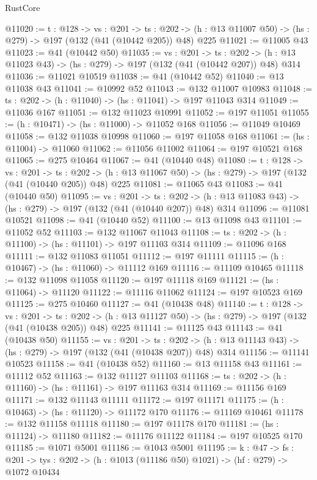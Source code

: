 \begin{lexlean}{RustCore}
\begin{coremodule}
@11020 := {t : @128} ->
  {vs : @201} ->
  {ts : @202} -> (h : @13 @11007 @50) -> (hs : @279) -> @197 (@132 (@41 (@10442 @205)) @48) @225
@11021 := @11005 @43
@11023 := @41 (@10442 @50)
@11035 := {vs : @201} ->
  {ts : @202} -> (h : @13 @11023 @43) -> (hs : @279) -> @197 (@132 (@41 (@10442 @207)) @48) @314
@11036 := @11021 @10519
@11038 := @41 (@10442 @52)
@11040 := @13 @11038 @43
@11041 := @10992 @52
@11043 := @132 @11007 @10983
@11048 := {ts : @202} -> (h : @11040) -> (hs : @11041) -> @197 @11043 @314
@11049 := @11036 @167
@11051 := @132 @11023 @10991
@11052 := @197 @11051
@11055 := (h : @10471) -> (hs : @11000) -> @11052 @168
@11056 := @11049 @10469
@11058 := @132 @11038 @10998
@11060 := @197 @11058 @168
@11061 := (hs : @11004) -> @11060
@11062 := @11056 @11002
@11064 := @197 @10521 @168
@11065 := @275 @10464
@11067 := @41 (@10440 @48)
@11080 := {t : @128} ->
  {vs : @201} ->
  {ts : @202} -> (h : @13 @11067 @50) -> (hs : @279) -> @197 (@132 (@41 (@10440 @205)) @48) @225
@11081 := @11065 @43
@11083 := @41 (@10440 @50)
@11095 := {vs : @201} ->
  {ts : @202} -> (h : @13 @11083 @43) -> (hs : @279) -> @197 (@132 (@41 (@10440 @207)) @48) @314
@11096 := @11081 @10521
@11098 := @41 (@10440 @52)
@11100 := @13 @11098 @43
@11101 := @11052 @52
@11103 := @132 @11067 @11043
@11108 := {ts : @202} -> (h : @11100) -> (hs : @11101) -> @197 @11103 @314
@11109 := @11096 @168
@11111 := @132 @11083 @11051
@11112 := @197 @11111
@11115 := (h : @10467) -> (hs : @11060) -> @11112 @169
@11116 := @11109 @10465
@11118 := @132 @11098 @11058
@11120 := @197 @11118 @169
@11121 := (hs : @11064) -> @11120
@11122 := @11116 @11062
@11124 := @197 @10523 @169
@11125 := @275 @10460
@11127 := @41 (@10438 @48)
@11140 := {t : @128} ->
  {vs : @201} ->
  {ts : @202} -> (h : @13 @11127 @50) -> (hs : @279) -> @197 (@132 (@41 (@10438 @205)) @48) @225
@11141 := @11125 @43
@11143 := @41 (@10438 @50)
@11155 := {vs : @201} ->
  {ts : @202} -> (h : @13 @11143 @43) -> (hs : @279) -> @197 (@132 (@41 (@10438 @207)) @48) @314
@11156 := @11141 @10523
@11158 := @41 (@10438 @52)
@11160 := @13 @11158 @43
@11161 := @11112 @52
@11163 := @132 @11127 @11103
@11168 := {ts : @202} -> (h : @11160) -> (hs : @11161) -> @197 @11163 @314
@11169 := @11156 @169
@11171 := @132 @11143 @11111
@11172 := @197 @11171
@11175 := (h : @10463) -> (hs : @11120) -> @11172 @170
@11176 := @11169 @10461
@11178 := @132 @11158 @11118
@11180 := @197 @11178 @170
@11181 := (hs : @11124) -> @11180
@11182 := @11176 @11122
@11184 := @197 @10525 @170
@11185 := @1071 @5001
@11186 := @1043 @5001
@11195 := {k : @47} ->
  {fs : @201} -> {tys : @202} -> (h : @1013 (@11186 @50) @1021) -> (hf : @279) -> @1072 @10434

\end{coremodule}
\end{lexlean}
